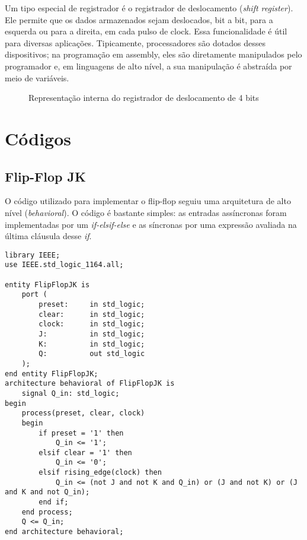 \documentclass[a4paper,12pt]{article}
\newenvironment{code}{\captionsetup{type=listing}}{}
\begin{document}
Um tipo especial de registrador é o registrador de deslocamento (\textit{shift register}). Ele permite que os dados armazenados sejam deslocados, bit a bit, para a esquerda ou para a direita, em cada pulso de clock. Essa funcionalidade é útil para diversas aplicações. Tipicamente, processadores são dotados desses dispositivos; na programação em assembly, eles são diretamente manipulados pelo programador e, em linguagens de alto nível, a sua manipulação é abstraída por meio de variáveis.

\begin{figure}[H]
    \centering
    
    \caption{Representação interna do registrador de deslocamento de 4 bits}
    \label{fig:enter-label}
\end{figure}

\section{Códigos} \label{sec: codigos}

\subsection{Flip-Flop JK}
O código utilizado para implementar o flip-flop seguiu uma arquitetura de alto nível (\textit{behavioral}). O código é bastante simples: as entradas assíncronas foram implementadas por um \textit{if-elsif-else} e as síncronas por uma expressão avaliada na última cláusula desse \textit{if}.

\begin{code}
    \begin{verbatim}
library IEEE;
use IEEE.std_logic_1164.all;

entity FlipFlopJK is
    port (
        preset:     in std_logic;
        clear:      in std_logic;
        clock:      in std_logic;
        J:          in std_logic;
        K:          in std_logic;
        Q:          out std_logic
    );
end entity FlipFlopJK;
architecture behavioral of FlipFlopJK is
    signal Q_in: std_logic;
begin
    process(preset, clear, clock)
    begin
        if preset = '1' then
            Q_in <= '1';
        elsif clear = '1' then
            Q_in <= '0';
        elsif rising_edge(clock) then
            Q_in <= (not J and not K and Q_in) or (J and not K) or (J and K and not Q_in);
        end if;
    end process;
    Q <= Q_in;
end architecture behavioral;
    \end{verbatim}
    \caption{Descrição de Hardware do flip-flop JK}
\end{code}
\end{document}

